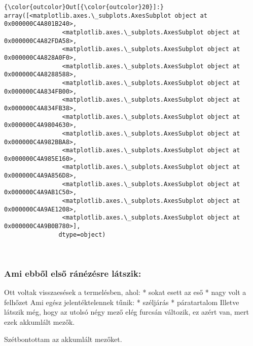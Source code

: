 \documentclass[11pt]{article}
\begin{document}
\begin{Verbatim}[commandchars=\\\{\}]
{\color{outcolor}Out[{\color{outcolor}20}]:} array([<matplotlib.axes.\_subplots.AxesSubplot object at 0x000000C4A801B240>,
                <matplotlib.axes.\_subplots.AxesSubplot object at 0x000000C4A82FDA58>,
                <matplotlib.axes.\_subplots.AxesSubplot object at 0x000000C4A828A0F0>,
                <matplotlib.axes.\_subplots.AxesSubplot object at 0x000000C4A8288588>,
                <matplotlib.axes.\_subplots.AxesSubplot object at 0x000000C4A834FB00>,
                <matplotlib.axes.\_subplots.AxesSubplot object at 0x000000C4A834FB38>,
                <matplotlib.axes.\_subplots.AxesSubplot object at 0x000000C4A9804630>,
                <matplotlib.axes.\_subplots.AxesSubplot object at 0x000000C4A982BBA8>,
                <matplotlib.axes.\_subplots.AxesSubplot object at 0x000000C4A985E160>,
                <matplotlib.axes.\_subplots.AxesSubplot object at 0x000000C4A9A856D8>,
                <matplotlib.axes.\_subplots.AxesSubplot object at 0x000000C4A9AB1C50>,
                <matplotlib.axes.\_subplots.AxesSubplot object at 0x000000C4A9AE1208>,
                <matplotlib.axes.\_subplots.AxesSubplot object at 0x000000C4A9B0B780>],
               dtype=object)
\end{Verbatim}
            
    \begin{center}
    \end{center}
    { \hspace*{\fill} \\}
    
    \subsubsection{Ami ebből első ránézésre
látszik:}\label{ami-ebbux151l-elsux151-ruxe1nuxe9zuxe9sre-luxe1tszik}

Ott voltak visszaesések a termelésben, ahol: * sokat esett az eső * nagy
volt a felhőzet Ami egész jelentéktelennek tűnik: * széljárás *
páratartalom Illetve látszik még, hogy az utolsó négy mező elég furcsán
változik, ez azért van, mert ezek akkumlált mezők.

    Szétbontottam az akkumlált mezőket.
\end{document}
